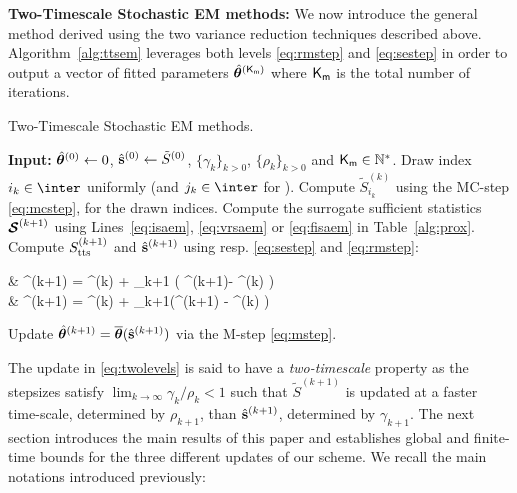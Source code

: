 \documentclass[conference,letterpaper]{IEEEtran}
\begin{document}
\vspace{0.08in}
\noindent \textbf{Two-Timescale Stochastic EM methods:}
We now introduce the general method derived using the two variance reduction techniques described above.
Algorithm~\ref{alg:ttsem} leverages both levels \eqref{eq:rmstep} and \eqref{eq:sestep} in order to output a vector of fitted parameters $\hat{{\bm{\theta}}}^{({\sf K}_{\sf m })}$ where ${\sf K}_{\sf m }$ is the total number of iterations.
\begin{algorithm}[H]
\caption{Two-Timescale Stochastic EM methods.}\label{alg:ttsem}
  \begin{algorithmic}[1]
  \STATE \textbf{Input:} $\hat{{\bm{\theta}}}^{(0)} \leftarrow 0$, $\hat{{\mathbf{s}}}^{(0)} \leftarrow \tilde{S}^{(0)}$, $\{\gamma_k\}_{k>0}$, $\{\rho_k\}_{k>0}$ and $ {\sf K}_{\sf m }\in \mathbb{N}^*$.
  \STATE Draw index $i_k \in \inter$ uniformly (and $j_k \in \inter$ for \FISAEM).
     \STATE Compute $\tilde{S}_{i_k}^{(k)}$ using the {\sf MC-step} \eqref{eq:mcstep},  for the drawn indices.
   \STATE Compute the surrogate sufficient statistics ${\bm{\mathcal{S}}}^{(k+1)}$ using Lines~\ref{eq:isaem}, \ref{eq:vrsaem} or \ref{eq:fisaem} in Table~\ref{alg:prox}.
   \STATE Compute $S_{\textrm{tts}}^{(k+1)}$ and $\hat{{\mathbf{s}}}^{(k+1)}$ using resp. \eqref{eq:sestep} and \eqref{eq:rmstep}:
\beq \label{eq:twolevels}
\begin{split}
& \stt^{(k+1)} = \stt^{(k)} + \rho_{k+1} \big( \StocEstep^{(k+1)}- \stt^{(k)}  \big)\\
&  \hat{\bss}^{(k+1)} =  \hat{\bss}^{(k)}  + \gamma_{k+1}(\stt^{(k+1)} - \hat{\bss}^{(k)} )
\end{split}
\eeq
   \STATE Update $\hat{{\bm{\theta}}}^{(k+1)} = \overline{{\bm{\theta}}}(  \hat{{\mathbf{s}}}^{(k+1)}) $ via the {\sf M-step} \eqref{eq:mstep}.
\ENDFOR
  \end{algorithmic}
\end{algorithm}
The update in \eqref{eq:twolevels} is said to have a \emph{two-timescale} property as the stepsizes satisfy $\lim_{k \to \infty} \gamma_k/\rho_k < 1$ such that $ \tilde{S}^{(k+1)} $  is updated at a faster time-scale, determined by $\rho_{k+1}$, than $\hat{{\mathbf{s}}}^{(k+1)}$, determined by $\gamma_{k+1}$.
The next section introduces the main results of this paper and establishes global and finite-time bounds for the three different updates of our scheme. 
We recall the main notations introduced previously:\vspace{-0.05in}
\end{document}
